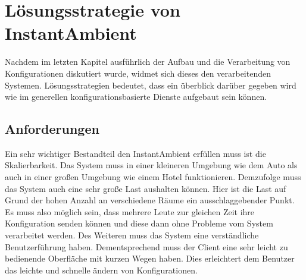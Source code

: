 \chapter{Lösungsstrategie von InstantAmbient}
Nachdem im letzten Kapitel ausführlich der Aufbau und die Verarbeitung von Konfigurationen diskutiert wurde, widmet sich dieses den verarbeitenden Systemen.
Lösungsstrategien bedeutet, dass ein überblick darüber gegeben wird wie im generellen konfigurationsbasierte Dienste aufgebaut sein können.

\section{Anforderungen}
Ein sehr wichtiger Bestandteil den InstantAmbient erfüllen muss ist die Skalierbarkeit. Das System muss in einer kleineren Umgebung wie dem Auto als auch in einer großen Umgebung wie einem Hotel funktionieren. Demzufolge muss das System auch eine sehr große Last aushalten können. Hier ist die Last auf Grund der hohen Anzahl an verschiedene Räume ein ausschlaggebender Punkt. Es muss also möglich sein, dass mehrere Leute zur gleichen Zeit ihre Konfiguration senden können und diese dann ohne Probleme vom System verarbeitet werden. Des Weiteren muss das System eine verständliche Benutzerführung haben. Dementsprechend muss der Client eine sehr leicht zu bedienende Oberfläche mit kurzen Wegen haben. Dies erleichtert dem Benutzer das leichte und schnelle ändern von Konfigurationen.   


